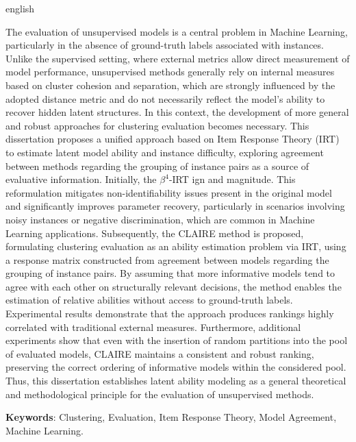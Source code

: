 \begin{resumo}[Abstract]
\begin{otherlanguage*}{english}


The evaluation of unsupervised models is a central problem in Machine Learning, particularly in the absence of ground-truth labels associated with instances. Unlike the supervised setting, where external metrics allow direct measurement of model performance, unsupervised methods generally rely on internal measures based on cluster cohesion and separation, which are strongly influenced by the adopted distance metric and do not necessarily reflect the model’s ability to recover hidden latent structures. In this context, the development of more general and robust approaches for clustering evaluation becomes necessary. This dissertation proposes a unified approach based on Item Response Theory (IRT) to estimate latent model ability and instance difficulty, exploring agreement between methods regarding the grouping of instance pairs as a source of evaluative information. Initially, the $\beta^4$-IRT ign and magnitude. This reformulation mitigates non-identifiability issues present in the original model and significantly improves parameter recovery, particularly in scenarios involving noisy instances or negative discrimination, which are common in Machine Learning applications. Subsequently, the CLAIRE method is proposed, formulating clustering evaluation as an ability estimation problem via IRT, using a response matrix constructed from agreement between models regarding the grouping of instance pairs. By assuming that more informative models tend to agree with each other on structurally relevant decisions, the method enables the estimation of relative abilities without access to ground-truth labels. Experimental results demonstrate that the approach produces rankings highly correlated with traditional external measures. Furthermore, additional experiments show that even with the insertion of random partitions into the pool of evaluated models, CLAIRE maintains a consistent and robust ranking, preserving the correct ordering of informative models within the considered pool. Thus, this dissertation establishes latent ability modeling as a general theoretical and methodological principle for the evaluation of unsupervised methods.


   \vspace{\onelineskip} 
 
   \noindent 
   \textbf{Keywords}: Clustering, Evaluation, Item Response Theory, Model Agreement, Machine Learning.
 \end{otherlanguage*}
 \end{resumo}
